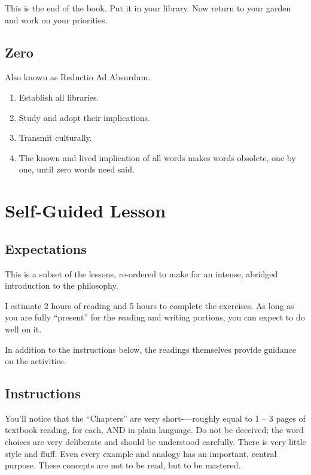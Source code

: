 \documentclass[
]{book}
\providecommand{\tightlist}{%
  \setlength{\itemsep}{0pt}\setlength{\parskip}{0pt}}
\begin{document}
This is the end of the book.
Put it in your library.
Now return to your garden and work on your priorities.

\section{Zero}\label{zero}

Also known as Reductio Ad Absurdum.

\begin{enumerate}
\def\labelenumi{\arabic{enumi}.}
\tightlist
\item
  Establish all libraries.
\item
  Study and adopt their implications.
\item
  Transmit culturally.
\item
  The known and lived implication of all words makes words obsolete, one by one, until zero words need said.
\end{enumerate}

\chapter{Self-Guided Lesson}\label{self-guided-lesson}

\section{Expectations}\label{expectations}

This is a subset of the lessons, re-ordered to make for an intense, abridged introduction to the philosophy.

I estimate 2 hours of reading and 5 hours to complete the exercises. As long as you are fully ``present'' for the reading and writing portions, you can expect to do well on it.

In addition to the instructions below, the readings themselves provide guidance on the activities.

\section{Instructions}\label{instructions}

You'll notice that the ``Chapters'' are very short-\/---roughly equal to 1 -- 3 pages of textbook reading, for each, AND in plain language. Do not be deceived; the word choices are very deliberate and should be understood carefully. There is very little style and fluff. Even every example and analogy has an important, central purpose. These concepts are not to be read, but to be mastered.
\end{document}
